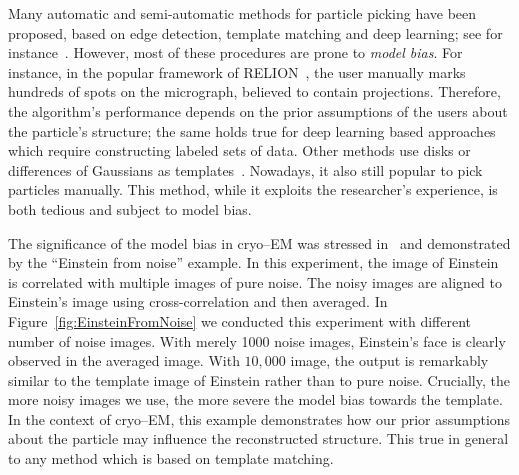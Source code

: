 \documentclass[english,11pt]{article}
\numberwithin{equation}{section}
\theoremstyle{plain}
\theoremstyle{definition}
\theoremstyle{remark}
\theoremstyle{plain}
\theoremstyle{remark}
\theoremstyle{plain}
\theoremstyle{plain}
\begin{document}
Many automatic and semi-automatic methods for particle picking have been proposed, based on edge detection, template matching and deep learning; see for instance~\cite{harauz1989automatic,ogura2004automatic,zhu2016deep,frank1983automatic,scheres2015semi,heimowitz2018apple}. 
However, most of these procedures are prone to \emph{model bias}. For instance, in the popular framework of RELION~\cite{scheres2015semi}, the user manually marks hundreds of spots on the micrograph, believed to contain projections. 
Therefore, the algorithm's performance depends on the prior assumptions of the users about the particle's structure; the same holds true for deep learning based approaches which require constructing labeled sets of data.
Other methods use disks or differences of Gaussians as templates~\cite{langlois2014automated,voss2009dog}.
Nowadays, it also still popular to pick particles manually. This method, while it exploits the researcher's experience, is both tedious and subject to model bias.

The significance of the model bias in cryo--EM was stressed in~\cite{shatsky2009method,henderson2013avoiding} and demonstrated by the ``Einstein from noise'' example.
In this experiment, the image of Einstein is correlated with multiple images of pure noise. The noisy images are aligned to Einstein's image using cross-correlation and then averaged. 
In Figure~\ref{fig:EinsteinFromNoise} we conducted this experiment with different number of noise images. With merely 1000 noise images, Einstein's face is clearly observed in the averaged image. With $10,000$  image, the output is remarkably similar to the template image of Einstein rather than to pure noise. Crucially, the more noisy images we use, the more severe the model bias towards the template. 
In the context of cryo--EM, this example demonstrates how our prior assumptions about the particle may influence the reconstructed structure.
This true in general to any method which is based on template matching.
\end{document}
